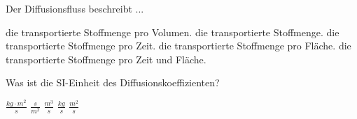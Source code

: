 \documentclass[11pt]{exam}
\begin{document}
\begin{questions}
\vspace{3mm}\question Der Diffusionsfluss beschreibt ...

\begin{choices}
	\choice die transportierte Stoffmenge pro Volumen.
	\choice die transportierte Stoffmenge.
	\choice die transportierte Stoffmenge pro Zeit.
	\choice die transportierte Stoffmenge pro Fläche.
	\choice die transportierte Stoffmenge pro Zeit und Fläche.
\end{choices}

\vspace{3mm}\question Was ist die SI-Einheit des Diffusionskoeffizienten?

\begin{choices}
	\choice \( \frac{kg \cdot m^2}{s} \)
	\choice \( \frac{s}{m^2} \)
	\choice \( \frac{m^3}{s} \)
	\choice \( \frac{kg}{s} \)
	\choice \( \frac{m^2}{s} \)
\end{choices}

\vspace{3mm}\end{questions}
\end{document}

